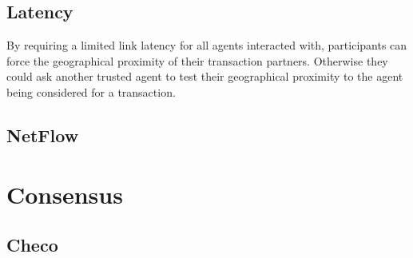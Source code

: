 \subsection{Latency}
By requiring a limited link latency for all agents interacted with, participants can force the geographical proximity of their transaction partners. Otherwise they could ask another trusted agent to test their geographical proximity to the agent being considered for a transaction.

\subsection{NetFlow}

\section{Consensus}
\subsection{Checo}
